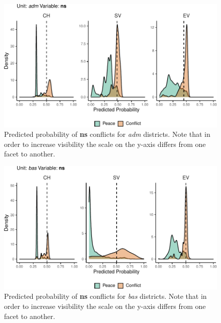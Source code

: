 \documentclass[a4paper,11pt]{article}
\begin{document}
\begin{figure}[H]

{\centering \includegraphics{thesis_files/figure-latex/appendix-densities-5} 

}

\caption[Predicted probability of \textbf{ns} conflicts for \textit{adm} districts.]{Predicted probability of \textbf{ns} conflicts for \textit{adm} districts. Note that in order to increase visibility the scale on the y-axis differs from one facet to another.}\label{fig:appendix-densities-5}
\end{figure}
\begin{figure}[H]

{\centering \includegraphics{thesis_files/figure-latex/appendix-densities-6} 

}

\caption[Predicted probability of \textbf{ns} conflicts for \textit{bas} districts.]{Predicted probability of \textbf{ns} conflicts for \textit{bas} districts. Note that in order to increase visibility the scale on the y-axis differs from one facet to another.}\label{fig:appendix-densities-6}
\end{figure}
\end{document}
